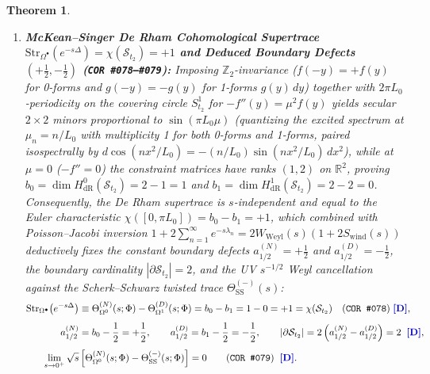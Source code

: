 \documentclass[11pt,a4paper]{article}
\newcommand{\catD}{\text{\textbf{\textcolor{blue!75!black}{[D]}}}}
\theoremstyle{definition}
\theoremstyle{plain}
\newtheorem{theorem}[axiom]{Theorem}
\theoremstyle{remark}
\begin{document}
\begin{theorem}
\begin{enumerate}[label=(\roman*)]
  \item \textbf{McKean--Singer De Rham Cohomological Supertrace $\mathrm{Str}_{\Omega^\bullet}(e^{-s\Delta}) = \chi(\mathcal{S}_{t_2}) = +1$ and Deduced Boundary Defects $(+\frac{1}{2}, -\frac{1}{2})$ (\texttt{COR~\#078--\#079}):}
  Imposing $\mathbb{Z}_2$-invariance ($f(-y) = +f(y)$ for 0-forms and $g(-y) = -g(y)$ for 1-forms $g(y)\,dy$) together with $2\pi L_0$-periodicity on the covering circle $S^1_{t_2}$ for $-f''(y) = \mu^2 f(y)$ yields secular $2\times 2$ minors proportional to $\sin(\pi L_0\mu)$ (quantizing the excited spectrum at $\mu_n = n/L_0$ with multiplicity 1 for both 0-forms and 1-forms, paired isospectrally by $d\cos(n x^2/L_0) = -(n/L_0)\sin(n x^2/L_0)\,dx^2$), while at $\mu = 0$ ($-f'' = 0$) the constraint matrices have ranks $(1, 2)$ on $\mathbb{R}^2$, proving $b_0 = \dim H^0_{\mathrm{dR}}(\mathcal{S}_{t_2}) = 2 - 1 = 1$ and $b_1 = \dim H^1_{\mathrm{dR}}(\mathcal{S}_{t_2}) = 2 - 2 = 0$. Consequently, the De Rham supertrace is $s$-independent and equal to the Euler characteristic $\chi([0, \pi L_0]) = b_0 - b_1 = +1$, which combined with Poisson--Jacobi inversion $1 + 2\sum_{n=1}^\infty e^{-s\lambda_n} = 2 W_{\mathrm{Weyl}}(s)(1 + 2 S_{\mathrm{wind}}(s))$ deductively fixes the constant boundary defects $a_{1/2}^{(N)} = +\frac{1}{2}$ and $a_{1/2}^{(D)} = -\frac{1}{2}$, the boundary cardinality $|\partial\mathcal{S}_{t_2}| = 2$, and the UV $s^{-1/2}$ Weyl cancellation against the Scherk--Schwarz twisted trace $\Theta_{\mathrm{SS}}^{(-)}(s)$:
  \begin{align}
  \mathrm{Str}_{\Omega^\bullet}\!\left(e^{-s\Delta}\right) &\equiv \Theta_{\Omega^0}^{(N)}(s; \Phi) - \Theta_{\Omega^1}^{(D)}(s; \Phi)
  = b_0 - b_1 = 1 - 0 = +1 = \chi(\mathcal{S}_{t_2})
  \quad \textnormal{(\texttt{COR~\#078})} \;\catD, \nonumber \\[4pt]
  a_{1/2}^{(N)} &= b_0 - \frac{1}{2} = +\frac{1}{2}, \qquad
  a_{1/2}^{(D)} = b_1 - \frac{1}{2} = -\frac{1}{2}, \qquad
  \left|\partial\mathcal{S}_{t_2}\right| = 2\left(a_{1/2}^{(N)} - a_{1/2}^{(D)}\right) = 2 \;\;\catD, \nonumber \\[4pt]
  \lim_{s \to 0^+}\sqrt{s}&\left[\Theta_{\Omega^0}^{(N)}(s; \Phi) - \Theta_{\mathrm{SS}}^{(-)}(s; \Phi)\right] = 0
  \qquad \textnormal{(\texttt{COR~\#079})} \;\;\catD. \label{eq:c4_mckean_singer_supertrace}
  \end{align}
\end{enumerate}
\end{theorem}
\end{document}
